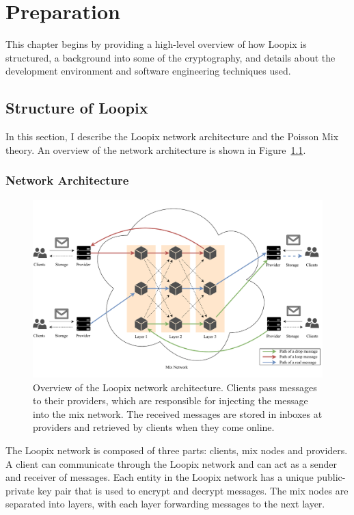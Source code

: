 \documentclass[final,dissertation.tex]{subfiles}
\begin{document}
\chapter{Preparation}

This chapter begins by providing a high-level overview of how Loopix is structured, a background into some of the cryptography, and details about the development environment and software engineering techniques used.

\section{Structure of Loopix}

In this section, I describe the Loopix network architecture and the Poisson Mix theory. An overview of the network architecture is shown in Figure~\ref{fig:loopix_network}. 

\subsection{Network Architecture}

\begin{figure}[h]
	\includegraphics[width=\linewidth]{../figs/loopix_network}
	\caption{Overview of the Loopix network architecture. Clients pass messages to their providers, which are responsible for injecting the message into the mix network. The received messages are stored in inboxes at providers and retrieved by clients when they come online.}\label{fig:loopix_network}
\end{figure}

The Loopix network is composed of three parts: clients, mix nodes and providers. A client can communicate through the Loopix network and can act as a sender and receiver of messages. Each entity in the Loopix network has a unique public-private key pair that is used to encrypt and decrypt messages. The mix nodes are separated into layers, with each layer forwarding messages to the next layer. 
\end{document}
